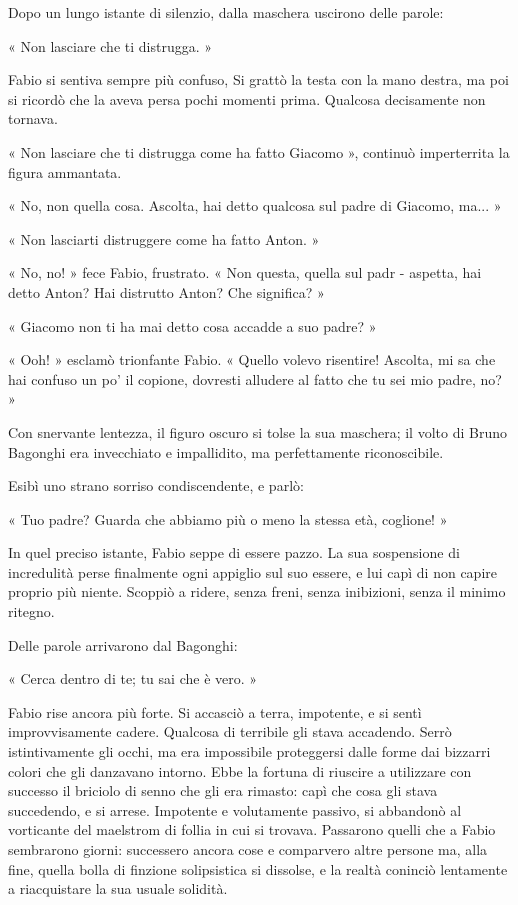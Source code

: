 Dopo un lungo istante di silenzio, dalla maschera uscirono delle parole:

« Non lasciare che ti distrugga. »

Fabio si sentiva sempre più confuso, Si grattò la testa con la mano destra, ma poi si ricordò che la aveva persa pochi momenti prima. Qualcosa decisamente non tornava.

« Non lasciare che ti distrugga come ha fatto Giacomo », continuò imperterrita la figura ammantata.

« No, non quella cosa. Ascolta, hai detto qualcosa sul padre di Giacomo, ma... »

« Non lasciarti distruggere come ha fatto Anton. »

« No, no! » fece Fabio, frustrato. « Non questa, quella sul padr - aspetta, hai detto Anton? Hai distrutto Anton? Che significa? »

« Giacomo non ti ha mai detto cosa accadde a suo padre? »

« Ooh! » esclamò trionfante Fabio. « Quello volevo risentire! Ascolta, mi sa che hai confuso un po' il copione, dovresti alludere al fatto che tu sei mio padre, no? »

Con snervante lentezza, il figuro oscuro si tolse la sua maschera; il volto di Bruno Bagonghi era invecchiato e impallidito, ma perfettamente riconoscibile.

Esibì uno strano sorriso condiscendente, e parlò:

« Tuo padre? Guarda che abbiamo più o meno la stessa età, coglione! »

In quel preciso istante, Fabio seppe di essere pazzo. La sua sospensione di incredulità perse finalmente ogni appiglio sul suo essere, e lui capì di non capire proprio più niente. Scoppiò a ridere, senza freni, senza inibizioni, senza il minimo ritegno.

Delle parole arrivarono dal Bagonghi:

« Cerca dentro di te; tu sai che è vero. »

Fabio rise ancora più forte. Si accasciò a terra, impotente, e si sentì improvvisamente cadere. Qualcosa di terribile gli stava accadendo. Serrò istintivamente gli occhi, ma era impossibile proteggersi dalle forme dai bizzarri colori che gli danzavano intorno. Ebbe la fortuna di riuscire a utilizzare con successo il briciolo di senno che gli era rimasto: capì che cosa gli stava succedendo, e si arrese.
Impotente e volutamente passivo, si abbandonò al vorticante del maelstrom di follia in cui si trovava. Passarono quelli che a Fabio sembrarono giorni: successero ancora cose e comparvero altre persone ma, alla fine, quella bolla di finzione solipsistica si dissolse, e la realtà coninciò lentamente a riacquistare la sua usuale solidità.